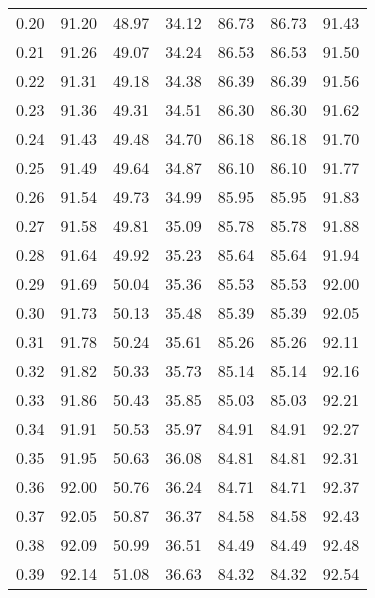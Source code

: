 \begin{tabular}{|c|c|c|c|c|c|c|}
      0.20 &     91.20 &     48.97 &      34.12 &   86.73 &      86.73 &         91.43 \\
      0.21 &     91.26 &     49.07 &      34.24 &   86.53 &      86.53 &         91.50 \\
      0.22 &     91.31 &     49.18 &      34.38 &   86.39 &      86.39 &         91.56 \\
      0.23 &     91.36 &     49.31 &      34.51 &   86.30 &      86.30 &         91.62 \\
      0.24 &     91.43 &     49.48 &      34.70 &   86.18 &      86.18 &         91.70 \\
      0.25 &     91.49 &     49.64 &      34.87 &   86.10 &      86.10 &         91.77 \\
      0.26 &     91.54 &     49.73 &      34.99 &   85.95 &      85.95 &         91.83 \\
      0.27 &     91.58 &     49.81 &      35.09 &   85.78 &      85.78 &         91.88 \\
      0.28 &     91.64 &     49.92 &      35.23 &   85.64 &      85.64 &         91.94 \\
      0.29 &     91.69 &     50.04 &      35.36 &   85.53 &      85.53 &         92.00 \\
      0.30 &     91.73 &     50.13 &      35.48 &   85.39 &      85.39 &         92.05 \\
      0.31 &     91.78 &     50.24 &      35.61 &   85.26 &      85.26 &         92.11 \\
      0.32 &     91.82 &     50.33 &      35.73 &   85.14 &      85.14 &         92.16 \\
      0.33 &     91.86 &     50.43 &      35.85 &   85.03 &      85.03 &         92.21 \\
      0.34 &     91.91 &     50.53 &      35.97 &   84.91 &      84.91 &         92.27 \\
      0.35 &     91.95 &     50.63 &      36.08 &   84.81 &      84.81 &         92.31 \\
      0.36 &     92.00 &     50.76 &      36.24 &   84.71 &      84.71 &         92.37 \\
      0.37 &     92.05 &     50.87 &      36.37 &   84.58 &      84.58 &         92.43 \\
      0.38 &     92.09 &     50.99 &      36.51 &   84.49 &      84.49 &         92.48 \\
      0.39 &     92.14 &     51.08 &      36.63 &   84.32 &      84.32 &         92.54 \\

\end{tabular}
